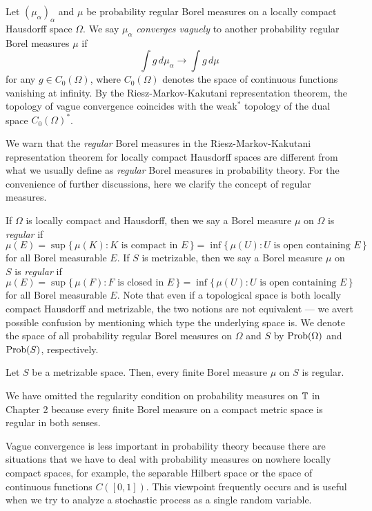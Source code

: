 \documentclass{../../small}
\begin{document}
\begin{defn}
Let $(\mu_\alpha)_\alpha$ and $\mu$ be probability regular Borel measures on a locally compact Hausdorff space $\Omega$.
We say $\mu_\alpha$ \emph{converges vaguely} to another probability regular Borel measures $\mu$ if
\[\int g\,d\mu_\alpha\to\int g\,d\mu\]
for any $g\in C_0(\Omega)$, where $C_0(\Omega)$ denotes the space of continuous functions vanishing at infinity.
By the Riesz-Markov-Kakutani representation theorem, the topology of vague convergence coincides with the weak$^*$ topology of the dual space $C_0(\Omega)^*$.
\end{defn}

We warn that the \emph{regular} Borel measures in the Riesz-Markov-Kakutani representation theorem for locally compact Hausdorff spaces are different from what we usually define as \emph{regular} Borel measures in probability theory.
For the convenience of further discussions, here we clarify the concept of regular measures.

\begin{defn}
If $\Omega$ is locally compact and Hausdorff, then we say a Borel measure $\mu$ on $\Omega$ is \emph{regular} if
\[\mu(E)=\sup\{\,\mu(K):K\text{ is compact in }E\,\}
=\inf\{\,\mu(U):U\text{ is open containing }E\,\}\]
for all Borel measurable $E$.
If $S$ is metrizable, then we say a Borel measure $\mu$ on $S$ is \emph{regular} if
\[\mu(E)=\sup\{\,\mu(F):F\text{ is closed in }E\,\}
=\inf\{\,\mu(U):U\text{ is open containing }E\,\}\]
for all Borel measurable $E$.
Note that even if a topological space is both locally compact Hausdorff and metrizable, the two notions are not equivalent --- we avert possible confusion by mentioning which type the underlying space is.
We denote the space of all probability regular Borel measures on $\Omega$ and $S$ by $\operatorname{Prob}(\Omega)$ and $\operatorname{Prob}(S)$, respectively.
\end{defn}

\begin{lem}
Let $S$ be a metrizable space.
Then, every finite Borel measure $\mu$ on $S$ is regular.
\end{lem}

We have omitted the regularity condition on probability measures on $\mathbb{T}$ in Chapter 2 because every finite Borel measure on a compact metric space is regular in both senses.

Vague convergence is less important in probability theory because there are situations that we have to deal with probability measures on nowhere locally compact spaces, for example, the separable Hilbert space or the space of continuous functions $C([0,1])$.
This viewpoint frequently occurs and is useful when we try to analyze a stochastic process as a single random variable.
\end{document}
